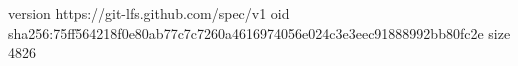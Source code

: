 version https://git-lfs.github.com/spec/v1
oid sha256:75ff564218f0e80ab77c7c7260a4616974056e024c3e3eec91888992bb80fc2e
size 4826
